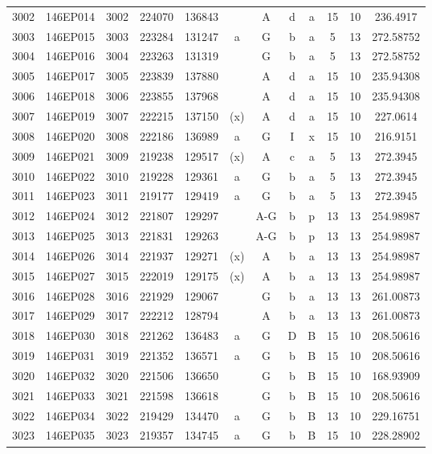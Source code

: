 \begin{tabular}{|*{12}{c|}}
3002 & 146EP014 & 3002 & 224070 & 136843 &  & A & d & a & 15 & 10 & 236.4917 \\ 
3003 & 146EP015 & 3003 & 223284 & 131247 & a & G & b & a & 5 & 13 & 272.58752 \\ 
3004 & 146EP016 & 3004 & 223263 & 131319 &  & G & b & a & 5 & 13 & 272.58752 \\ 
3005 & 146EP017 & 3005 & 223839 & 137880 &  & A & d & a & 15 & 10 & 235.94308 \\ 
3006 & 146EP018 & 3006 & 223855 & 137968 &  & A & d & a & 15 & 10 & 235.94308 \\ 
3007 & 146EP019 & 3007 & 222215 & 137150 & (x) & A & d & a & 15 & 10 & 227.0614 \\ 
3008 & 146EP020 & 3008 & 222186 & 136989 & a & G & I & x & 15 & 10 & 216.9151 \\ 
3009 & 146EP021 & 3009 & 219238 & 129517 & (x) & A & c & a & 5 & 13 & 272.3945 \\ 
3010 & 146EP022 & 3010 & 219228 & 129361 & a & G & b & a & 5 & 13 & 272.3945 \\ 
3011 & 146EP023 & 3011 & 219177 & 129419 & a & G & b & a & 5 & 13 & 272.3945 \\ 
3012 & 146EP024 & 3012 & 221807 & 129297 &  & A-G & b & p & 13 & 13 & 254.98987 \\ 
3013 & 146EP025 & 3013 & 221831 & 129263 &  & A-G & b & p & 13 & 13 & 254.98987 \\ 
3014 & 146EP026 & 3014 & 221937 & 129271 & (x) & A & b & a & 13 & 13 & 254.98987 \\ 
3015 & 146EP027 & 3015 & 222019 & 129175 & (x) & A & b & a & 13 & 13 & 254.98987 \\ 
3016 & 146EP028 & 3016 & 221929 & 129067 &  & G & b & a & 13 & 13 & 261.00873 \\ 
3017 & 146EP029 & 3017 & 222212 & 128794 &  & A & b & a & 13 & 13 & 261.00873 \\ 
3018 & 146EP030 & 3018 & 221262 & 136483 & a & G & D & B & 15 & 10 & 208.50616 \\ 
3019 & 146EP031 & 3019 & 221352 & 136571 & a & G & b & B & 15 & 10 & 208.50616 \\ 
3020 & 146EP032 & 3020 & 221506 & 136650 &  & G & b & B & 15 & 10 & 168.93909 \\ 
3021 & 146EP033 & 3021 & 221598 & 136618 &  & G & b & B & 15 & 10 & 208.50616 \\ 
3022 & 146EP034 & 3022 & 219429 & 134470 & a & G & b & B & 13 & 10 & 229.16751 \\ 
3023 & 146EP035 & 3023 & 219357 & 134745 & a & G & b & B & 15 & 10 & 228.28902 \\ 

\end{tabular}
